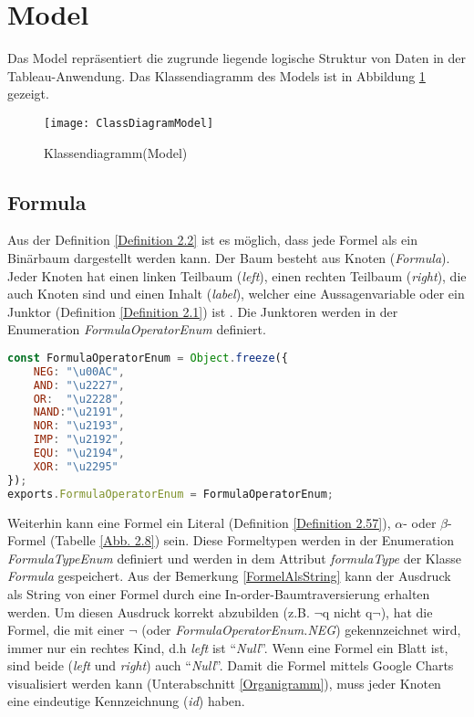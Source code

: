 \section{Model}\label{sec:Model}
Das Model repräsentiert die zugrunde liegende logische Struktur von Daten in der Tableau-Anwendung. Das Klassendiagramm des Models ist in Abbildung \ref{fig:KlassendiagrammModel} gezeigt.

\begin{figure}[!h] \centering

\texttt{[image: ClassDiagramModel]}
\caption[KlassendiagrammModel]{Klassendiagramm(Model)}\label{fig:KlassendiagrammModel}

\end{figure}

\subsection{Formula}
Aus der Definition \ref{Definition 2.2} ist es möglich, dass jede Formel als ein Binärbaum dargestellt werden kann. Der Baum besteht aus Knoten (\textit{Formula}). Jeder Knoten hat einen linken Teilbaum (\textit{left}), einen rechten Teilbaum (\textit{right}), die auch Knoten sind und einen Inhalt (\textit{label}), welcher eine Aussagenvariable oder ein Junktor (Definition \ref{Definition 2.1}) ist \cite{Krohn}. Die Junktoren werden in der Enumeration \textit{FormulaOperatorEnum} definiert.
\begin{lstlisting}[language=JavaScript, caption= FormulaOperatorEnum, basicstyle=\scriptsize]
const FormulaOperatorEnum = Object.freeze({
    NEG: "\u00AC",
    AND: "\u2227",
    OR:  "\u2228",
    NAND:"\u2191",
    NOR: "\u2193",
    IMP: "\u2192",
    EQU: "\u2194",
    XOR: "\u2295"
});
exports.FormulaOperatorEnum = FormulaOperatorEnum;
\end{lstlisting}

Weiterhin kann eine Formel ein Literal (Definition \ref{Definition 2.57}), $\alpha$- oder $\beta$-Formel (Tabelle \ref{Abb. 2.8}) sein. Diese Formeltypen werden in der Enumeration \textit{FormulaTypeEnum} definiert und werden in dem Attribut \textit{formulaType} der Klasse \textit{Formula} gespeichert. Aus der Bemerkung \ref{FormelAlsString} kann der Ausdruck als String von einer Formel durch eine In-order-Baumtraversierung erhalten werden. Um diesen Ausdruck korrekt abzubilden (z.B. $\neg$q nicht q$\neg$), hat die Formel, die mit einer $\neg$ (oder \textit{FormulaOperatorEnum.NEG}) gekennzeichnet wird, immer nur ein rechtes Kind, d.h \textit{left} ist ``\textit{Null}''. Wenn eine Formel ein Blatt ist, sind beide (\textit{left} und \textit{right}) auch ``\textit{Null}''. Damit die Formel mittels Google Charts visualisiert werden kann (Unterabschnitt \ref{Organigramm}), muss jeder Knoten eine eindeutige Kennzeichnung (\textit{id}) haben.

